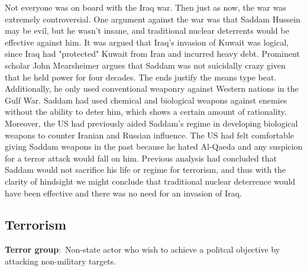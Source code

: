 \documentclass[nobib]{tufte-handout}
\newcommand{\defn}[2]{\noindent\textbf{#1}:\ #2}
\begin{document}
Not everyone was on board with the Iraq war. Then just as now, 
the war was extremely controversial. One argument against 
the war was that Saddam Hussein may be evil, but he wasn't insane, 
and traditional nuclear deterrents would be effective against him. 
It was argued that Iraq's invasion of Kuwait 
was logical, since Iraq had "protected" Kuwait 
from Iran and incurred heavy debt. Prominent scholar 
John Mearsheimer argues that Saddam was not 
suicidally crazy given that he held power for four 
decades. The ends justify the means type beat. 
Additionally, he only used conventional weaponry 
against Western nations in the Gulf War. Saddam had 
used chemical and biological weapons against enemies 
without the ability to deter him, which shows a 
certain amount of rationality. Moreover, the US had previously 
aided Saddam's regime in developing biological 
weapons to counter Iranian and Russian influence. 
The US had felt comfortable giving Saddam weapons 
in the past because he hated Al-Qaeda and any 
suspicion for a terror attack would fall on him. 
Previous analysis had concluded that Saddam would 
not sacrifice his life or regime for terrorism, 
and thus with the clarity of hindsight we might 
conclude that traditional nuclear deterrence would 
have been effective and there was no need for an
invasion of Iraq. 

\subsection{Terrorism}

\defn{Terror group}{Non-state actor who wish to achieve a politcal 
objective by attacking non-military targets.} 
\end{document}
